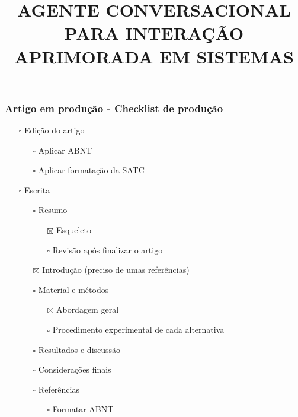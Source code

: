 \documentclass[
]{article}
\title{\textbf{AGENTE CONVERSACIONAL PARA INTERAÇÃO APRIMORADA EM
SISTEMAS}}
\author{}
\date{}
\providecommand{\tightlist}{%
  \setlength{\itemsep}{0pt}\setlength{\parskip}{0pt}}
\begin{document}
\maketitle

\subsubsection{Artigo em produção - Checklist de
produção}\label{artigo-em-produuxe7uxe3o---checklist-de-produuxe7uxe3o}

\begin{itemize}
\tightlist
\item[$\square$]
  Edição do artigo

  \begin{itemize}
  \tightlist
  \item[$\square$]
    Aplicar ABNT
  \item[$\square$]
    Aplicar formatação da SATC
  \end{itemize}
\item[$\square$]
  Escrita

  \begin{itemize}
  \tightlist
  \item[$\square$]
    Resumo

    \begin{itemize}
    \tightlist
    \item[$\boxtimes$]
      Esqueleto
    \item[$\square$]
      Revisão após finalizar o artigo
    \end{itemize}
  \item[$\boxtimes$]
    Introdução (preciso de umas referências)
  \item[$\square$]
    Material e métodos

    \begin{itemize}
    \tightlist
    \item[$\boxtimes$]
      Abordagem geral
    \item[$\square$]
      Procedimento experimental de cada alternativa
    \end{itemize}
  \item[$\square$]
    Resultados e discussão
  \item[$\square$]
    Considerações finais
  \item[$\square$]
    Referências

    \begin{itemize}
    \tightlist
    \item[$\square$]
      Formatar ABNT
    \end{itemize}
  \end{itemize}
\end{itemize}
\end{document}
